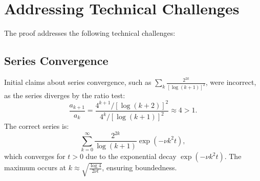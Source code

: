 \documentclass[12pt]{article}
\begin{document}
\section{Addressing Technical Challenges}
\label{sec:challenges}
The proof addresses the following technical challenges:

\subsection{Series Convergence}
Initial claims about series convergence, such as $\sum_k \frac{2^{2k}}{[\log(k+1)]^2}$, 
were incorrect, as the series diverges by the ratio test:
\begin{equation}
\frac{a_{k+1}}{a_k} = \frac{4^{k+1} / [\log(k+2)]^2}{4^k / [\log(k+1)]^2} \approx 4 > 1.
\end{equation}
The correct series is:
\begin{equation}
\sum_{k=0}^\infty \frac{2^{2k}}{\log(k + 1)} \exp(-\nu k^2 t),
\end{equation}
which converges for $t > 0$ due to the exponential decay $\exp(-\nu k^2 t)$. 
The maximum occurs at $k \approx \sqrt{\frac{\log 4}{2\nu t}}$, ensuring boundedness.
\end{document}
